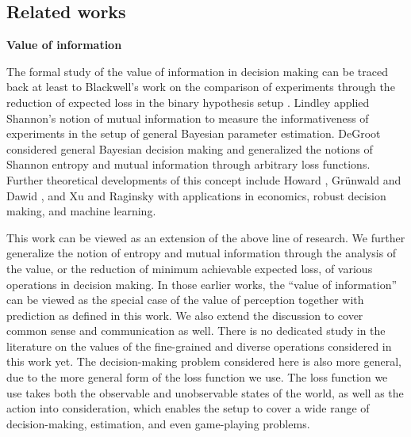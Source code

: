 \documentclass{article}
\begin{document}
\subsection{Related works}\label{appd:survey}
\noindent\textbf{Value of information}

The formal study of the value of information in decision making can be traced back at least to Blackwell’s work on the comparison of experiments through the reduction of expected loss in the binary hypothesis setup \cite{blackwell1951comparison, blackwell1953equivalent}. 
Lindley \cite{lindley1956measure} applied Shannon's notion of mutual information to measure the informativeness of experiments in the setup of general Bayesian parameter estimation. 
DeGroot \cite{DeGroot62} considered general Bayesian decision making and generalized the notions of Shannon entropy and mutual information through arbitrary loss functions.
Further theoretical developments of this concept include Howard \cite{Howard_voi}, Gr\"unwald and Dawid \cite{max_gen_ent}, and Xu and Raginsky \cite{MER22} with applications in economics, robust decision making, and machine learning.

This work can be viewed as an extension of the above line of research. We further generalize the notion of entropy and mutual information through the analysis of the value, or the reduction of minimum achievable expected loss, of various operations in decision making. In those earlier works, the ``value of information'' can be viewed as the special case of the value of perception together with prediction as defined in this work. 
We also extend the discussion to cover common sense and communication as well. 
There is no dedicated study in the literature on the values of the fine-grained and diverse operations considered in this work yet. 
The decision-making problem considered here is also more general, due to the more general form of the loss function we use.
The loss function we use takes both the observable and unobservable states of the world, as well as the action into consideration, which enables the setup to cover a wide range of decision-making, estimation, and even game-playing problems.
\end{document}
